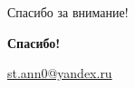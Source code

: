 \documentclass{beamer}
\begin{document}
\begin{frame}{Спасибо за внимание!}
    \begin{center}
        \Huge \textbf{Спасибо!}
        
        \vspace{1cm}
        \Large \href{mailto:st.ann0@yandex.ru}{st.ann0@yandex.ru}
    \end{center}
\end{frame}
\end{document}
